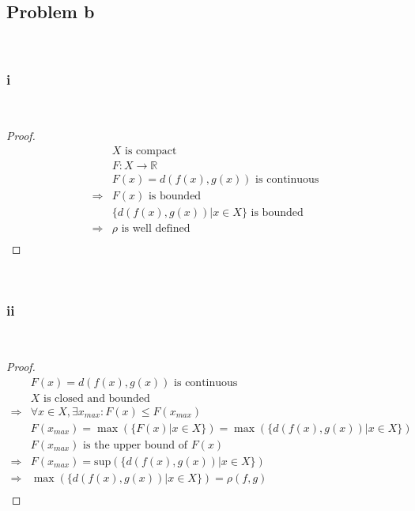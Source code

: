 \documentclass{article}
\begin{document}
~

\subsection*{Problem b}

~

\subsubsection*{i}

~

\begin{proof}
    \begin{align*}
        &X\text{ is compact}\\
        &F:X\rightarrow \mathbb{R} \\
        &F(x)=d(f(x),g(x))\text{ is continuous}\\
        \Rightarrow&F(x)\text{ is bounded}\\
        &\{d(f(x),g(x))|x\in X\}\text{ is bounded}\\
        \Rightarrow&\rho\text{ is well defined}\\
    \end{align*}
\end{proof}

~

\subsubsection*{ii}

~

\begin{proof}
    \begin{align*}
        &F(x)=d(f(x),g(x))\text{ is continuous}\\
        &X\text{ is closed and bounded}\\
        \Rightarrow&\forall x\in X,\exists x_{max}:F(x)\leqslant F(x_{max})\\
        &F(x_{max})=\max(\{F(x)|x\in X\})=\max(\{d(f(x),g(x))|x\in X\})\\
        &F(x_{max})\text{ is the upper bound of }F(x)\\
        \Rightarrow&F(x_{max})=\text{sup}(\{d(f(x),g(x))|x\in X\})\\
        \Rightarrow&\max(\{d(f(x),g(x))|x\in X\})=\rho(f,g)\\
    \end{align*}
\end{proof}
\end{document}

